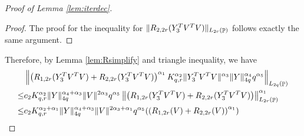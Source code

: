 \documentclass[10pt,a4paper]{amsart}
\DeclareMathOperator{\Pb}{\mathbb{P}}
\DeclarePairedDelimiter{\norm}{\lVert}{\rVert}
\newcommand{\norml}[1]{\left\lVert#1\right\rVert}
\begin{document}
\begin{proof}[Proof of Lemma \ref{lem:iterdec}]
\begin{proof}
The proof for the inequality for $\norm{R_{2,2r}(Y_3^TV^TV)}_{L_{2r}(\Pb)}  $ follows exactly the same argument.



\end{proof}

Therefore, by Lemma \ref{lem:Rsimplify} and triangle inequality, we have
\begin{align*}
    &\norml{\left(R_{1,2r}(Y_3^TV^TV)+R_{2,2r}(Y_3^TV^TV)\right)^{\alpha_1}K_{q,r}^{\alpha_2}\norm{Y_3^TV^TV}^{\alpha_3} \norm{Y}_{4q} ^{\alpha_4}q^{\alpha_5}}_{L_{2q}(\Pb)}
    \\ \le &c_2K_{q,r}^{\alpha_2}\norm{Y}_{4q}^{\alpha_4+\alpha_3}\norm{V}^{2 \alpha_3}q^{\alpha_5}\norml{\left(R_{1,2r}(Y_3^TV^TV)+R_{2,2r}(Y_3^TV^TV)\right)}_{L_{2r}(\Pb)}^{\alpha_1}
    \\ \le & c_2 K_{q,r}^{\alpha_2+\alpha_1}\norm{Y}_{4q}^{\alpha_4+\alpha_3}\norm{V}^{2 \alpha_3+\alpha_1}q^{\alpha_5}(\left(R_{1,2r}(V)+R_{2,2r}(V)\right)^{\alpha_1})
\end{align*}


\end{proof}
\end{document}
